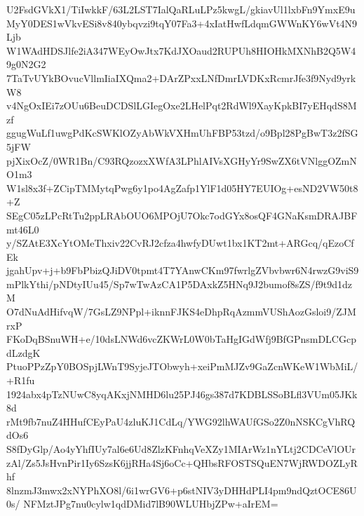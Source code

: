 U2FsdGVkX1/TiIwkkF/63L2LST7IalQaRLuLPz5kwgL/gkiavUl1lxbFn9YmxE9u
MyY0DES1wVkvESi8v840ybqvzi9tqY07Fa3+4xIatHwfLdqmGWWnKY6wVt4N9Ljb
W1WAdHDSJlfe2iA347WEyOwJtx7KdJXOaud2RUPUh8HIOHkMXNhB2Q5W49g0N2G2
7TaTvUYkBOvucVllmIiaIXQma2+DArZPxxLNfDmrLVDKxRcmrJfe3f9Nyd9yrkW8
v4NgOxIEi7zOUu6BeuDCDSlLGIegOxe2LHelPqt2RdWl9XayKpkBI7yEHqdS8Mzf
ggugWuLf1uwgPdKcSWKlOZyAbWkVXHmUhFBP53tzd/o9Bpl28PgBwT3z2fSG5jFW
pjXixOcZ/0WR1Bn/C93RQzozxXWfA3LPhlAIVsXGHyYr9SwZX6tVNlggOZmNO1m3
W1sl8x3f+ZCipTMMytqPwg6y1po4AgZafp1YlF1d05HY7EUIOg+esND2VW50t8+Z
SEgC05zLPcRtTu2ppLRAbOUO6MPOjU7Okc7odGYx8osQF4GNaKsmDRAJBFmt46L0
y/SZAtE3XcYtOMeThxiv22CvRJ2cfza4hwfyDUwt1bx1KT2mt+ARGcq/qEzoCfEk
jgahUpv+j+b9FbPbizQJiDV0tpmt4T7YAnwCKm97fwrlgZVbvbwr6N4rwzG9viS9
mPlkYthi/pNDtyIUu45/Sp7wTwAzCA1P5DAxkZ5HNq9J2bumof8sZS/f9t9d1dzM
O7dNuAdHifvqW/7GsLZ9NPpl+iknnFJKS4eDhpRqAzmmVUShAozGsloi9/ZJMrxP
FKoDqBSnuWH+e/10dsLNWd6vcZKWrL0W0bTaHgIGdWfj9BfGPnsmDLCGcpdLzdgK
PtuoPPzZpY0BOSpjLWnT9SyjeJTObwyh+xeiPmMJZv9GaZcnWKeW1WbMiL/+R1fu
1924abx4pTzNUwC8yqAKxjNMHD6lu25PJ46gs387d7KDBLSSoBLfl3VUm05JKk8d
rMt9fb7nuZ4HHufCEyPaU4zluKJ1CdLq/YWG92lhWAUfGSo2Z0nNSKCgVhRQdOs6
S8fDyGlp/Ao4yYhfIUy7al6e6Ud8ZlzKFnhqVeXZy1MIArWz1nYLtj2CDCeVlOUr
zAl/Zs5JsHvnPir1Iy6SzsK6jjRHa4Sj6oCc+QHbsRFOSTSQuEN7WjRWDOZLyRhf
8lnzmJ3mwx2xNYPhXO8l/6i1wrGV6+p6stNIV3yDHHdPLI4pm9ndQztOCE86U0s/
NFMztJPg7nu0cylw1qdDMid7lB90WLUHbjZPw+aIrEM=
